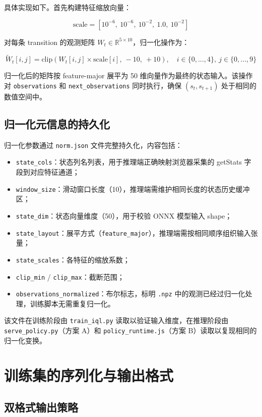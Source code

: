 具体实现如下。首先构建特征缩放向量：

\[
\text{scale} = [10^{-6},\ 10^{-6},\ 10^{-2},\ 1.0,\ 10^{-2}]
\]

对每条 transition 的观测矩阵 $W_t \in \mathbb{R}^{5 \times 10}$，归一化操作为：

\[
\tilde{W}_t[i, j] = \text{clip}(W_t[i, j] \times \text{scale}[i],\ -10,\ +10), \quad i \in \{0,...,4\},\ j \in \{0,...,9\}
\]

归一化后的矩阵按 feature-major 展平为 50 维向量作为最终的状态输入。该操作对 \texttt{observations} 和 \texttt{next\_observations} 同时执行，确保 $(s_t, s_{t+1})$ 处于相同的数值空间中。

\subsection{归一化元信息的持久化}

归一化参数通过 \texttt{norm.json} 文件完整持久化，内容包括：

\begin{itemize}
    \item \texttt{state\_cols}：状态列名列表，用于推理端正确映射浏览器采集的 getStats 字段到对应特征通道；
    \item \texttt{window\_size}：滑动窗口长度（10），推理端需维护相同长度的状态历史缓冲区；
    \item \texttt{state\_dim}：状态向量维度（50），用于校验 ONNX 模型输入 shape；
    \item \texttt{state\_layout}：展平方式（\texttt{feature\_major}），推理端需按相同顺序组织输入张量；
    \item \texttt{state\_scales}：各特征的缩放系数；
    \item \texttt{clip\_min} / \texttt{clip\_max}：截断范围；
    \item \texttt{observations\_normalized}：布尔标志，标明 \texttt{.npz} 中的观测已经过归一化处理，训练脚本无需重复归一化。
\end{itemize}

该文件在训练阶段由 \texttt{train\_iql.py} 读取以验证输入维度，在推理阶段由 \texttt{serve\_policy.py}（方案 A）和 \texttt{policy\_runtime.js}（方案 B）读取以复现相同的归一化变换。

\section{训练集的序列化与输出格式}

\subsection{双格式输出策略}

